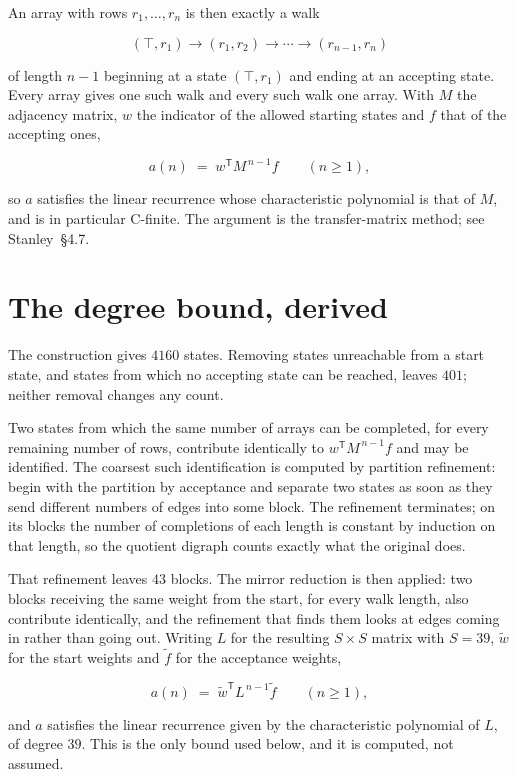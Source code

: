 \documentclass[11pt]{article}
\theoremstyle{definition}
\begin{document}
An array with rows $r_1,\dots,r_n$ is then exactly a walk

\[(\top,r_1) \to (r_1,r_2) \to \cdots \to (r_{n-1},r_n)\]

of length $n-1$ beginning at a state $(\top,r_1)$ and ending at an accepting state. Every array gives one such walk and every such walk one array. With $M$ the adjacency matrix, $w$ the indicator of the allowed starting states and $f$ that of the accepting ones,

\[a(n) \;=\; w^{\mathsf T} M^{\,n-1} f \qquad (n \ge 1),\]

so $a$ satisfies the linear recurrence whose characteristic polynomial is that of $M$, and is in particular C-finite. The argument is the transfer-matrix method; see Stanley~\S4.7.

\section{The degree bound, derived}

The construction gives $4160$ states. Removing states unreachable from a start state, and states from which no accepting state can be reached, leaves $401$; neither removal changes any count.

Two states from which the same number of arrays can be completed, for every remaining number of rows, contribute identically to $w^{\mathsf T}M^{\,n-1}f$ and may be identified. The coarsest such identification is computed by partition refinement: begin with the partition by acceptance and separate two states as soon as they send different numbers of edges into some block. The refinement terminates; on its blocks the number of completions of each length is constant by induction on that length, so the quotient digraph counts exactly what the original does.

That refinement leaves $43$ blocks. The mirror reduction is then applied: two blocks receiving the same weight from the start, for every walk length, also contribute identically, and the refinement that finds them looks at edges coming in rather than going out. Writing $L$ for the resulting $S \times S$ matrix with $S = 39$, $\tilde w$ for the start weights and $\tilde f$ for the acceptance weights,

\[a(n) \;=\; \tilde w^{\mathsf T} L^{\,n-1} \tilde f \qquad (n \ge 1),\]

and $a$ satisfies the linear recurrence given by the characteristic polynomial of $L$, of degree $39$. This is the only bound used below, and it is computed, not assumed.
\end{document}
